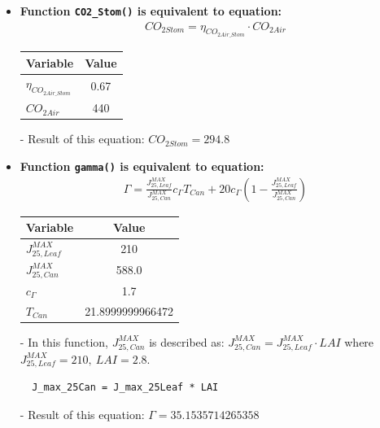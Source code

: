 \documentclass[a4paper]{article}
\numberwithin{equation}{section}
\begin{document}
\begin{itemize}
  \item \textbf{Function \texttt{CO2\_Stom()} is equivalent to equation:}
        \begin{align*}
          CO_{2Stom} = \eta_{CO_{2Air\_Stom}} \cdot CO_{2Air}
        \end{align*}

        \begin{table}[H]
          \centering
          \begin{tabular}{@{}lS@{}}
            \toprule
            \textbf{Variable}          & \textbf{Value} \\
            \midrule
            \( \eta_{CO_{2Air\_Stom}} \) & 0.67           \\
            \( CO_{2Air} \)              & 440            \\
            \bottomrule
          \end{tabular}
        \end{table}

  \item[-] Result of this equation: \( CO_{2Stom} = 294.8 \)

  \item \textbf{Function \texttt{gamma()} is equivalent to equation:}
        \begin{align*}
          \Gamma = \frac{J^{MAX}_{25,Leaf}}{J^{MAX}_{25,Can}}c_{\Gamma} T_{Can} + 20 c_{\Gamma} \left(1-\frac{J^{MAX}_{25,Leaf}}{J^{MAX}_{25,Can}}\right)
        \end{align*}

        \begin{table}[H]
          \centering
          \begin{tabular}{@{}lS[table-format=3.13]@{}}
            \toprule
            \textbf{Variable}     & \textbf{Value}   \\
            \midrule
            \( J^{MAX}_{25,Leaf} \) & 210              \\
            \( J^{MAX}_{25,Can} \)  & 588.0            \\
            \( c_{\Gamma} \)        & 1.7              \\
            \( T_{Can} \)           & 21.8999999966472 \\
            \bottomrule
          \end{tabular}
        \end{table}

  \item[-] In this function, \( J^{MAX}_{25,Can} \) is described as: \( J^{MAX}_{25,Can} = J^{MAX}_{25,Leaf} \cdot LAI \) where \( J^{MAX}_{25,Leaf} = 210,\ LAI = 2.8 \).
        \begin{mdframed}[leftline=false,rightline=false,backgroundcolor=magenta!10,nobreak=true]
          \begin{verbatim}
  J_max_25Can = J_max_25Leaf * LAI
          \end{verbatim}
        \end{mdframed}
  \item[-] Result of this equation: \( \Gamma = 35.1535714265358 \)


\end{itemize}
\end{document}

